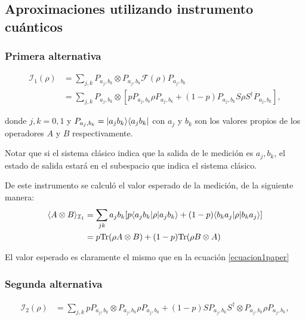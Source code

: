 \documentclass[12pt,oneside]{book}\raggedbottom{}
\begin{document}
\subsection*{Aproximaciones utilizando instrumento cuánticos}

\subsubsection{Primera alternativa}

 \begin{equation}
    \begin{split}
        \mathcal{I}_1(\rho)&=\sum_{j,k}P_{a_j,b_k}\otimes P_{a_j,b_k} \mathcal{F}(\rho) P_{a_j,b_k}\\
        &=\sum_{j,k}P_{a_j,b_k}\otimes[p P_{a_j,b_k}\rho P_{a_j,b_k}+(1-p)P_{a_j,b_k}S\rho S^\dagger P_{a_j,b_k}],
\end{split}
\end{equation}

donde $j,k=0,1$ y $P_{a_j,b_k}=|a_j b_k\rangle \langle a_j b_k|$ con $a_j$ y $b_k$ son los valores propios de los operadores $A$ y $B$ respectivamente.


Notar que si el sistema clásico indica que la salida de le medición es $a_j,b_k$, el estado de salida estará en el subespacio que indica el sistema clásico.

De este instrumento se calculó el  valor esperado de la medición, de la siguiente manera:\begin{equation}\label{ExpectedValueI1}\begin{split}
	\langle A\otimes B \rangle_{\mathcal{I}_1}&=\sum_{jk} a_{j}b_k[p\langle a_j b_k|\rho |a_j b_k\rangle + (1-p)\langle b_k a_j|\rho | b_k a_j\rangle] \\
   & = p{\rm Tr}(\rho A\otimes B)+(1-p){\rm Tr}(\rho B\otimes A)\\
\end{split}\end{equation}

El valor esperado es claramente el mismo que en la ecuación {\ref{ecuacion1paper}}
\subsubsection{Segunda alternativa}

\begin{equation}
    \begin{split}
        \mathcal{I}_2(\rho)&=\sum_{j,k} pP_{a_j,b_k} \otimes P_{a_j,b_k} \rho P_{a_j,b_k}+(1-p)SP_{a_j,b_k}S^\dagger\otimes P_{a_j,b_k} \rho P_{a_j,b_k},\\
    \end{split}
\end{equation} 
\end{document}
